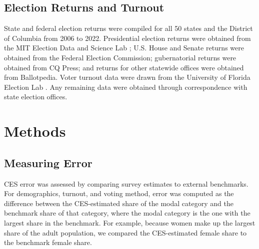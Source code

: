 \documentclass[12pt]{article}
\begin{document}
\subsection*{Election Returns and Turnout}

State and federal election returns were compiled for all 50 states and the District of Columbia from 2006 to 2022. Presidential election returns were obtained from the MIT Election Data and Science Lab \parencite{mit_election_data_and_science_lab_us_2017-1}; U.S. House and Senate returns were obtained from the Federal Election Commission; gubernatorial returns were obtained from CQ Press; and returns for other statewide offices were obtained from Ballotpedia. Voter turnout data were drawn from the University of Florida Election Lab \parencite{mcdonald_voter_nodate}. Any remaining data were obtained through correspondence with state election offices.



\section{Methods}
\subsection*{Measuring Error}
CES error was assessed by comparing survey estimates to external benchmarks. For demographics, turnout, and voting method, error was computed as the difference between the CES-estimated share of the modal category and the benchmark share of that category, where the modal category is the one with the largest share in the benchmark. For example, because women make up the largest share of the adult population, we compared the CES-estimated female share to the benchmark female share.
\end{document}
